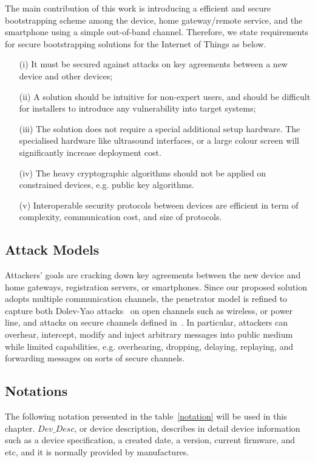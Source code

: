 The main contribution of this work is introducing a efficient and secure bootstrapping scheme among the device, home gateway/remote service, and the smartphone using a simple out-of-band channel. Therefore, we state requirements for secure bootstrapping solutions for the Internet of Things as below.
\begin{enumerate}
\item [(i)] It must be secured against attacks on key agreements between a new device and other devices;
\item [(ii)] A solution should be intuitive for non-expert users, and should be difficult for installers to introduce any vulnerability into target systems; 
\item [(iii)] The solution does not require a special additional setup hardware. The specialised hardware like ultrasound interfaces, or a large colour screen will significantly increase deployment cost. 
\item[(iv)] The heavy cryptographic algorithms should not be applied on constrained devices, e.g. public key algorithms. 
\item[(v)] Interoperable security protocols between devices are efficient in term of complexity, communication cost, and size of protocols.  
\end{enumerate} 

\subsection{Attack Models}

Attackers' goals are cracking down key agreements between the new device and home gateways, registration servers, or smartphones. Since our proposed solution adopts multiple communication channels, the penetrator model is refined to capture both Dolev-Yao attacks~\cite{dolev-yao} on open channels such as wireless, or power line, and attacks on secure channels defined in~\cite{ttnguyen}. In particular, attackers can overhear, intercept, modify and inject arbitrary messages into public medium while limited capabilities, e.g. overhearing, dropping, delaying, replaying, and forwarding messages on sorts of secure channels. 

\subsection{Notations}

The following notation presented in the table~\ref{notation} will be used in this chapter. $Dev\_Desc$, or device description, describes in detail device information such as a device specification, a created date, a version, current firmware, and etc, and it is normally provided by manufactures. 

